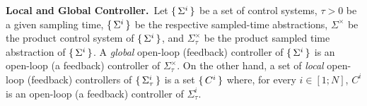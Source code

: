 \smallskip
\noindent\textbf{Local and Global Controller.}\
Let $\set{\Sigma^i} $ be a set of control systems, $\tau >0$ be a given sampling time, $\set{\Sigma^i} $ be the respective sampled-time abstractions, $\Sigma^\times$ be the product control system of $\set{\Sigma^i} $, and $\Sigma^\times_\tau$ be the product sampled time abstraction of $\set{\Sigma^i} $.
A \emph{global} open-loop (feedback) controller of $\set{\Sigma^i} $ is an open-loop (a feedback) controller of $\Sigma_\tau^\times$.
On the other hand, a set of \emph{local} open-loop (feedback) controllers of $\set{\Sigma^i_\tau} $ is a set $\set{C^i} $ where, for every $i\in [1;N]$, $C^i$ is an open-loop (a feedback) controller of $\Sigma^i_\tau$.

